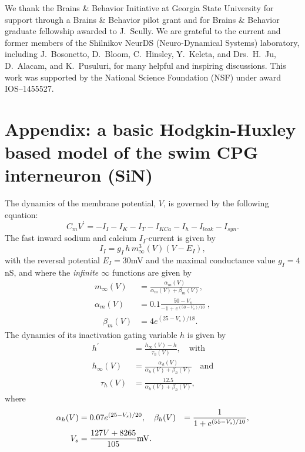 \documentclass[nofootinbib,aip,amsmath,amssymb,preprint,twocolumn,floatfix,10pt]{revtex4-2}
\begin{document}
\begin{acknowledgments}
We thank the Brains \& Behavior Initiative at Georgia State University for support through a Brains \& Behavior pilot grant and for Brains \& Behavior graduate fellowship awarded to J.~Scully. We are grateful to the current and former members of the Shilnikov NeurDS (Neuro-Dynamical Systems) laboratory, including J.~Bosonetto, D.~Bloom, C.~Hinsley, Y.~Keleta, and Drs.~H.~Ju, D.~Alacam, and K.~Pusuluri, for many helpful and inspiring discussions. This work was supported by the National Science Foundation (NSF) under award  IOS--1455527.
\end{acknowledgments}

\label{fig:supp} 
\section*{Appendix: a basic Hodgkin-Huxley based model of the swim CPG interneuron (SiN)} \label{sec:appendix1}
The dynamics of the membrane potential, $V$, is governed by the following equation:
\begin{equation}
 	C_{m} {V}^\prime = -I_{I} - I_K - I_{T}  - I_{KCa} -  I_{h}  - I_{leak}  - I_{syn}.  \label{a1}
 \end{equation}
 The fast inward sodium and calcium $I_{I}$-current is given by   
\begin{equation}
I_{I}=g_{I}\,h\, m^{3}_{\infty}(V)(V-E_{I}), 
 \end{equation}
with the reversal potential $E_{I}=30$mV and the maximal conductance value $g_{I}=4$nS, and where the {\em infinite $\infty$ } functions are given by   
\begin{align}
 m_{\infty}(V) &= \frac{\alpha_{m}(V)}{\alpha_{m}(V) +\beta_{m}(V)},   \\
 \alpha_{m}(V) &= 0.1 \frac{50-V_s}{-1+e^{(50-V_s)/10}}\ , \\ 
 \quad \beta_{m}(V) &= 4 e^{(25-V_s)/18}.  
\end{align}
 The dynamics of its inactivation  gating variable $h$ is given by      
\begin{align}
 {h}^\prime &=  \frac{h_{\infty}(V)-h}{ {\tau_{h}(V)} }, \quad \mbox{with} \quad \\
h_{\infty}(V) &= \frac{\alpha_{h}(V)}{\alpha_{h}(V) +\beta_{h}(V)}\quad \mbox{and} \\
 \quad \tau_{h}(V) &= \frac{12.5}{\alpha_{h}(V) +\beta_{h}(V)}, 
\end{align}
where 
 \begin{align}
 \alpha_{h}(V) &= 0.07 e^{(25-V_s)/20}, \quad 
 \beta_{h}(V) &= \frac{1}{1+e^{(55-V_s)/10}}, \\
 V_s &= \frac{127V+8265}{105}{\rm mV}.
 \end{align} 
\end{document}
